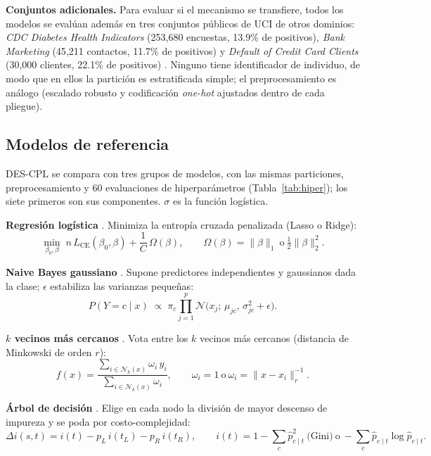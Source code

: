 \documentclass[pdflatex,sn-mathphys-num]{sn-jnl}
\theoremstyle{plain}
\begin{document}
\textbf{Conjuntos adicionales.} Para evaluar si el mecanismo se transfiere, todos los modelos se evalúan además en tres conjuntos públicos de UCI de otros dominios: \emph{CDC Diabetes Health Indicators} (253{,}680 encuestas, 13.9\% de positivos), \emph{Bank Marketing} (45{,}211 contactos, 11.7\% de positivos) \cite{bib_moro_2014} y \emph{Default of Credit Card Clients} (30{,}000 clientes, 22.1\% de positivos) \cite{bib_yeh_2009}. Ninguno tiene identificador de individuo, de modo que en ellos la partición es estratificada simple; el preprocesamiento es análogo (escalado robusto y codificación \emph{one-hot} ajustados dentro de cada pliegue).

\subsection{Modelos de referencia}\label{subsec:referencia}

DES-CPL se compara con tres grupos de modelos, con las mismas particiones, preprocesamiento y 60 evaluaciones de hiperparámetros (Tabla~\ref{tab:hiper}); los siete primeros son sus componentes. $\sigma$ es la función logística.

\textbf{Regresión logística} \cite{bib_tibshirani}. Minimiza la entropía cruzada penalizada (Lasso o Ridge):
\begin{equation}
\min_{\beta_0,\beta}\; n\,L_{\text{CE}}(\beta_0,\beta) + \frac{1}{C}\,\Omega(\beta), \qquad \Omega(\beta)=\lVert\beta\rVert_1 \ \text{o} \ \tfrac{1}{2}\lVert\beta\rVert_2^2 .
\label{eq:logistica}
\end{equation}

\textbf{Naive Bayes gaussiano} \cite{bib_zhang}. Supone predictores independientes y gaussianos dada la clase; $\epsilon$ estabiliza las varianzas pequeñas:
\begin{equation}
P(Y=c\mid x)\;\propto\;\pi_c\prod_{j=1}^{p}\mathcal{N}\!\big(x_j;\,\mu_{jc},\,\sigma^2_{jc}+\epsilon\big).
\label{eq:bayes}
\end{equation}

\textbf{$k$ vecinos más cercanos} \cite{bib_cover}. Vota entre los $k$ vecinos más cercanos (distancia de Minkowski de orden $r$):
\begin{equation}
f(x)=\frac{\sum_{i\in\mathcal{N}_k(x)} \omega_i\, y_i}{\sum_{i\in\mathcal{N}_k(x)} \omega_i}, \qquad \omega_i = 1 \ \text{o}\ \omega_i = \lVert x-x_i\rVert_r^{-1}.
\label{eq:knn}
\end{equation}

\textbf{Árbol de decisión} \cite{bib_breiman_cart}. Elige en cada nodo la división de mayor descenso de impureza y se poda por costo-complejidad:
\begin{equation}
\Delta i(s,t)=i(t)-p_L\,i(t_L)-p_R\,i(t_R), \qquad i(t)=1-\sum_c \hat p_{c\mid t}^2 \ \text{(Gini)} \ \text{o} \ -\sum_c \hat p_{c\mid t}\log\hat p_{c\mid t}.
\label{eq:arbol}
\end{equation}
\end{document}
